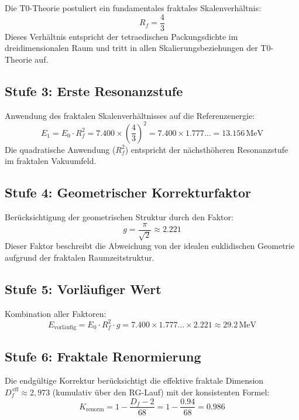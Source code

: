 	Die T0-Theorie postuliert ein fundamentales fraktales Skalenverhältnis:
	\begin{equation}
		R_f = \frac{4}{3}
	\end{equation}
	Dieses Verhältnis entspricht der tetraedischen Packungsdichte im dreidimensionalen Raum und tritt in allen Skalierungsbeziehungen der T0-Theorie auf.
	
	\subsection{Stufe 3: Erste Resonanzstufe}
	
	Anwendung des fraktalen Skalenverhältnisses auf die Referenzenergie:
	\begin{equation}
		E_1 = E_0 \cdot R_f^2 = 7.400 \times \left(\frac{4}{3}\right)^2 = 7.400 \times 1.777\ldots = 13.156\,\text{MeV}
	\end{equation}
	Die quadratische Anwendung ($R_f^2$) entspricht der nächsthöheren Resonanzstufe im fraktalen Vakuumfeld.
	
	\subsection{Stufe 4: Geometrischer Korrekturfaktor}
	
	Berücksichtigung der geometrischen Struktur durch den Faktor:
	\begin{equation}
		g = \frac{\pi}{\sqrt{2}} \approx 2.221
	\end{equation}
	Dieser Faktor beschreibt die Abweichung von der idealen euklidischen Geometrie aufgrund der fraktalen Raumzeitstruktur.
	
	\subsection{Stufe 5: Vorläufiger Wert}
	
	Kombination aller Faktoren:
	\begin{equation}
		E_{\text{vorläufig}} = E_0 \cdot R_f^2 \cdot g = 7.400 \times 1.777\ldots \times 2.221 \approx 29.2\,\text{MeV}
	\end{equation}
	
	\subsection{Stufe 6: Fraktale Renormierung}
	
	Die endgültige Korrektur berücksichtigt die effektive fraktale Dimension $D_f^{\,\text{eff}} \approx 2{,}973$ (kumulativ über den RG-Lauf) mit der konsistenten Formel:
	\begin{equation}
		K_{\text{renorm}} = 1 - \frac{D_f - 2}{68} = 1 - \frac{0.94}{68} = 0.986
	\end{equation}
	
